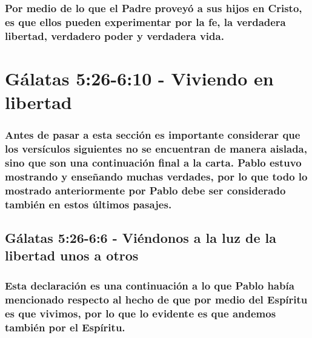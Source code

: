 \documentclass[11a pt,twoside]{article}
\let\oldsection\section
\renewcommand{\section}{\needspace{6\baselineskip}\oldsection}
\let\oldsubsection\subsection
\renewcommand{\subsection}{\needspace{5\baselineskip}\oldsubsection}
\let\oldsubsubsection\subsubsection
\renewcommand{\subsubsection}{\needspace{4\baselineskip}\oldsubsubsection}
\begin{document}
\subsubsection{Por medio de lo que el Padre proveyó a sus hijos en
Cristo, es que ellos pueden experimentar por la fe, la verdadera
libertad, verdadero poder y verdadera
vida.}\label{por-medio-de-lo-que-el-padre-proveyuxf3-a-sus-hijos-en-cristo-es-que-ellos-pueden-experimentar-por-la-fe-la-verdadera-libertad-verdadero-poder-y-verdadera-vida.}

\section{Gálatas 5:26-6:10 - Viviendo en
libertad}\label{guxe1latas-526-610---viviendo-en-libertad}

\subsubsection{Antes de pasar a esta sección es importante considerar
que los versículos siguientes no se encuentran de manera aislada, sino
que son una continuación final a la carta. Pablo estuvo mostrando y
enseñando muchas verdades, por lo que todo lo mostrado anteriormente por
Pablo debe ser considerado también en estos últimos
pasajes.}\label{antes-de-pasar-a-esta-secciuxf3n-es-importante-considerar-que-los-versuxedculos-siguientes-no-se-encuentran-de-manera-aislada-sino-que-son-una-continuaciuxf3n-final-a-la-carta.-pablo-estuvo-mostrando-y-enseuxf1ando-muchas-verdades-por-lo-que-todo-lo-mostrado-anteriormente-por-pablo-debe-ser-considerado-tambiuxe9n-en-estos-uxfaltimos-pasajes.}

\subsection{Gálatas 5:26-6:6 - Viéndonos a la luz de la libertad unos a
otros}\label{guxe1latas-526-66---viuxe9ndonos-a-la-luz-de-la-libertad-unos-a-otros}

\subsubsection{Esta declaración es una continuación a lo que Pablo había
mencionado respecto al hecho de que por medio del Espíritu es que
vivimos, por lo que lo evidente es que andemos también por el
Espíritu.}\label{esta-declaraciuxf3n-es-una-continuaciuxf3n-a-lo-que-pablo-habuxeda-mencionado-respecto-al-hecho-de-que-por-medio-del-espuxedritu-es-que-vivimos-por-lo-que-lo-evidente-es-que-andemos-tambiuxe9n-por-el-espuxedritu.}
\end{document}
